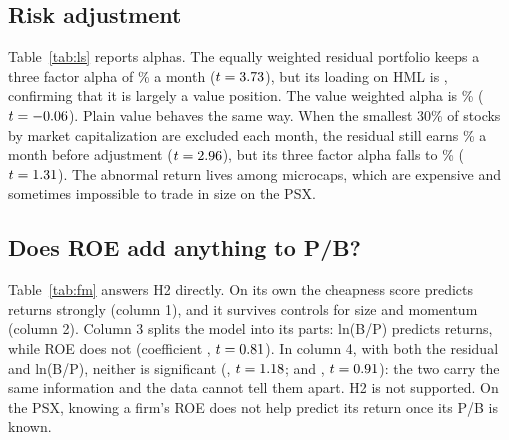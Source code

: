 \documentclass[11pt]{article}
\begin{document}
\subsection{Risk adjustment}

Table~\ref{tab:ls} reports alphas. The equally weighted residual portfolio keeps a three factor alpha
of \FFew{}\% a month ($t = 3.73{}$), but its loading on HML is \HMLew{}, confirming that it is
largely a value position. The value weighted alpha is \FFvw{}\% ($t = -0.06{}$). Plain value behaves
the same way. When the smallest 30\% of stocks by market capitalization are excluded each month, the
residual still earns \MicroLS{}\% a month before adjustment ($t = 2.96{}$), but its three factor
alpha falls to \MicroFF{}\% ($t = 1.31{}$). The abnormal return lives among microcaps, which
are expensive and sometimes impossible to trade in size on the PSX.

\begin{table}[htbp]
\centering\footnotesize
\caption{Long short portfolios (cheapest minus dearest quintile). Mean and alphas are in percent per
month; $t$ statistics (Newey and West, six lags) in parentheses. Sharpe is annualized. 3F is the
three factor model with market, SMB and HML built from the same universe; HML $\beta$ is the loading
on HML in that model. ``No microcaps'' drops stocks below the 30th percentile of market cap each month.}
\label{tab:ls}
\setlength{\tabcolsep}{3pt}

\end{table}

\subsection{Does ROE add anything to P/B?}

Table~\ref{tab:fm} answers H2 directly. On its own the cheapness score predicts returns strongly
(column 1), and it survives controls for size and momentum (column 2). Column 3 splits the model
into its parts: ln(B/P) predicts returns, while ROE does not (coefficient \FMthreeROE{}, $t =
0.81{}$). In column 4, with both the residual and ln(B/P), neither is significant
(\FMfourResid{}, $t = 1.18{}$; and \FMfourVal{}, $t = 0.91{}$): the two carry the
same information and the data cannot tell them apart. H2 is not supported. On the PSX, knowing a
firm's ROE does not help predict its return once its P/B is known.

\begin{table}[htbp]
\centering\small
\caption{Fama and MacBeth regressions of next month returns on standardized characteristics.
Coefficients are the average monthly slope in percent per one standard deviation; Newey and West
$t$ statistics in parentheses. All regressions include a constant (not shown).}
\label{tab:fm}

\end{table}
\end{document}
